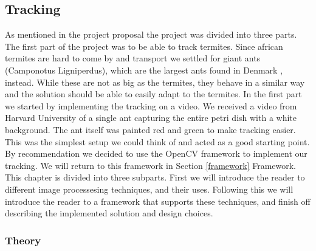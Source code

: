 
\subsection{Tracking}
\label{tracking}
As mentioned in the project proposal the project was divided into three parts. The first part of the project was to be able to track termites. Since african termites are hard to come by and transport we settled for giant ants (Camponotus Ligniperdus), which are the largest ants found in Denmark \cite{fogn}, instead. While these are not as big as the termites, they behave in a similar way and the solution should be able to easily adapt to the termites. In the first part we started by implementing the tracking on a video. We received a video from Harvard University of a single ant capturing the entire petri dish with a white background. The ant itself was painted red and green to make tracking easier. This was the simplest setup we could think of and acted as a good starting point. By recommendation we decided to use the OpenCV \cite{opencv} framework to implement our tracking. We will return to this framework in Section \ref{framework} Framework. \\

This chapter is divided into three subparts. First we will introduce the reader to different image processesing techniques, and their uses. Following this we will introduce the reader to a framework that supports these techniques, and finish off describing the implemented solution and design choices.

% 
% 

\subsubsection{Theory} \mbox{}\par


